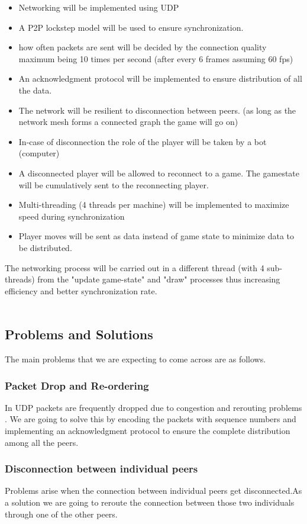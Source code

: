\documentclass[ebook,12pt,oneside,openany]{article}
\begin{document}
\begin{itemize}
\item Networking will be implemented using UDP
\item A P2P lockstep model will be used to ensure synchronization.
\item how often packets are sent will be decided by the connection quality maximum being 10 times per second (after every 6 frames assuming 60 fps)
\item An acknowledgment protocol will be implemented to ensure distribution of all the data.
\item The network will be resilient to disconnection between peers. (as long as the network mesh forms a connected graph the game will go on)
\item In-case of disconnection the role of the player will be taken by a bot (computer)
\item A disconnected player will be allowed to reconnect to a game. The gamestate will be cumulatively sent to the reconnecting player.  
\item Multi-threading (4 threads per machine) will be implemented to maximize speed during synchronization
\item Player moves will be sent as data instead of game state to minimize data to be distributed. 

\end{itemize}
The networking process will be carried out in a different thread (with 4 sub-threads) from the "update game-state" and "draw" processes thus increasing efficiency and better synchronization rate.
\\
\\
\subsection{Problems and Solutions}
The main problems that we are expecting to come across are as follows.
\subsubsection{Packet Drop and Re-ordering}
In UDP packets are frequently dropped due to congestion and rerouting problems . We are going to solve this by encoding the packets with sequence numbers and implementing an acknowledgment protocol to ensure the complete distribution among all the peers.

\subsubsection{Disconnection between individual peers}
Problems arise when the connection between individual peers get disconnected.As a solution we are going to reroute the connection between those two individuals through one of the other peers.
\end{document}
